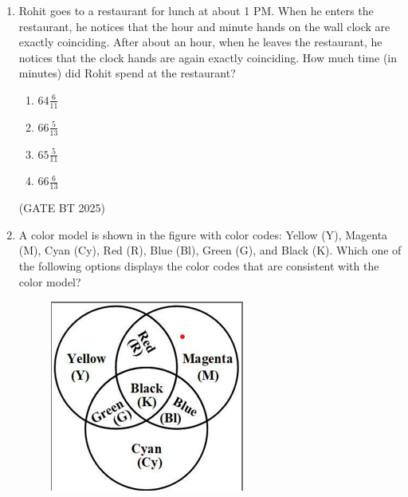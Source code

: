 \documentclass[journal,12pt,onecolumn]{IEEEtran}
\theoremstyle{remark}
\begin{document}
\begin{enumerate}
\item Rohit goes to a restaurant for lunch at about 1 PM. When he enters the restaurant, he notices that the hour and minute hands on the wall clock are exactly coinciding. After about an hour, when he leaves the restaurant, he notices that the clock hands are again exactly coinciding. How much time (in minutes) did Rohit spend at the restaurant?  
\begin{multicols}{2}
\begin{enumerate}
    \item $64 \frac{6}{11}$
    \item $66 \frac{5}{13}$
    \item $65 \frac{5}{11}$
    \item $66 \frac{6}{13}$
\end{enumerate} 
\end{multicols}
\hfill (GATE BT 2025)

\item A color model is shown in the figure with color codes: Yellow (Y), Magenta (M), Cyan (Cy), Red (R), Blue (Bl), Green (G), and Black (K).  
Which one of the following options displays the color codes that are consistent with the color model?  

\begin{figure}
    \includegraphics[width=0.6\columnwidth]{figs/question.png}
\end{figure}


\end{enumerate}
\end{document}
